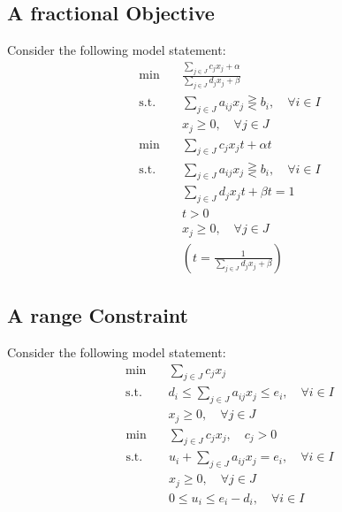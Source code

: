 			\subsection{A fractional Objective}
				Consider the following model statement:
				\begin{align}
					\min \quad & \frac{\sum_{j\in J}c_{j}x_j + \alpha}{\sum_{j\in J}d_{j}x_j + \beta} \nonumber\\
					\text{s.t.} \quad & \sum_{j\in J}a_{ij}x_j \gtreqless b_i, \quad \forall i\in I \nonumber\\
					                  & x_j \ge 0, \quad \forall j\in J \nonumber
				\end{align}
				\begin{align}
					\min \quad & \sum_{j\in J}c_{j}x_jt + \alpha t \nonumber\\
					\text{s.t.} \quad & \sum_{j\in J}a_{ij}x_j \gtreqless b_i, \quad \forall i\in I \nonumber\\
									  & \sum_{j\in J}d_jx_jt + \beta t = 1\nonumber\\
									  & t > 0 \nonumber\\
					                  & x_j \ge 0, \quad \forall j\in J \nonumber\\
					                  & (t = \frac1{\sum_{j\in J}d_jx_j + \beta}) \nonumber
				\end{align}
			\subsection{A range Constraint}
				Consider the following model statement:
				\begin{align}
					\min \quad & \sum_{j\in J}c_jx_j \nonumber\\
					\text{s.t.} \quad & d_i\le \sum_{j\in J}a_{ij}x_j \le e_i, \quad \forall i\in I \nonumber\\
					                  & x_j \ge 0, \quad \forall j\in J \nonumber
				\end{align}
				\begin{align}
					\min \quad & \sum_{j\in J}c_jx_j, \quad c_j > 0 \nonumber\\
					\text{s.t.} \quad & u_i + \sum_{j\in J}a_{ij}x_j = e_i, \quad \forall i\in I \nonumber\\
					                  & x_j \ge 0, \quad \forall j\in J \nonumber\\
					                  & 0\le u_i \le e_i-d_i, \quad \forall i\in I \nonumber
				\end{align}

